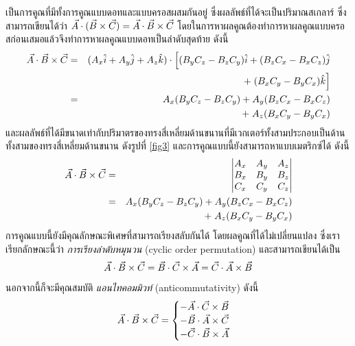 เป็นการคูณที่มีทั้งการคูณแบบดอทและแบบครอสผสมกันอยู่ ซึ่งผลลัพธ์ที่ได้จะเป็นปริมาณสเกลาร์ ซึ่งสามารถเขียนได้ว่า $\vec{A}\cdot(\vec{B}\times\vec{C}) = \vec{A}\cdot\vec{B}\times\vec{C}$ โดยในการหาผลคูณต้องทำการหาผลคูณแบบครอสก่อนเสมอแล้วจึงทำการหาผลคูณแบบดอทเป็นลำดับสุดท้าย ดังนี้
\begin{eqnarray}\label{TripleScalarProd}
\vec{A}\cdot\vec{B}\times\vec{C} &=& (A_x\hat{i} + A_y\hat{j} + A_z\hat{k})\cdot\Big[(B_yC_z - B_zC_y)\hat{i} + (B_zC_x - B_xC_z)\hat{j} \nonumber \\
        & & +\;(B_xC_y - B_yC_x)\hat{k}\Big] \nonumber \\
        &=& A_x(B_yC_z - B_zC_y) + A_y(B_zC_x - B_xC_z) \nonumber \\
        & & +\;A_z(B_xC_y - B_yC_x)
\end{eqnarray}
และผลลัพธ์ที่ได้มีขนาดเท่ากับปริมาตรของทรงสี่เหลี่ยมด้านขนานที่มีเวกเตอร์ทั้งสามประกอบเป็นด้านทั้งสามของทรงสี่เหลี่ยมด้านขนาน ดังรูปที่ \ref{fig3} และการคูณแบบนี้ยังสามารถหาแบบเมตริกซ์ได้ ดังนี้
\begin{eqnarray}\label{ScalarTripleProdMatrix}
\vec{A}\cdot\vec{B}\times\vec{C} &=& \begin{vmatrix} A_x & A_y & A_z \\ B_x & B_y & B_z \\ C_x & C_y & C_z \end{vmatrix} \nonumber \\
        &=& A_x(B_yC_z - B_zC_y) + A_y(B_zC_x - B_xC_z) \nonumber \\
        & & +\;A_z(B_xC_y - B_yC_x)
\end{eqnarray}
การคูณแบบนี้ยังมีคุณลักษณะพิเศษที่สามารถเรียงสลับกันได้ โดยผลคูณที่ได้ไม่เปลี่ยนแปลง ซึ่งเราเรียกลักษณะนี้ว่า \textit{การเรียงลำดับหมุนวน} (cyclic order permutation) และสามารถเขียนได้เป็น
\begin{equation}\label{ScalarTripleProdCyclicOrder}
\vec{A}\cdot\vec{B}\times\vec{C} = \vec{B}\cdot\vec{C}\times\vec{A} = \vec{C}\cdot\vec{A}\times\vec{B}
\end{equation}
นอกจากนี้ก็จะมีคุณสมบัติ \textit{แอนไทคอมมิวท์} (anticommutativity) ดังนี้
\begin{equation}\label{ScalarTripleProdAntiCommute}
\vec{A}\cdot\vec{B}\times\vec{C} = \begin{cases} - \vec{A}\cdot\vec{C}\times\vec{B}  \\
                                                            - \vec{B}\cdot\vec{A}\times\vec{C} \\
                                                            - \vec{C}\cdot\vec{B}\times\vec{A} \end{cases}
\end{equation}

